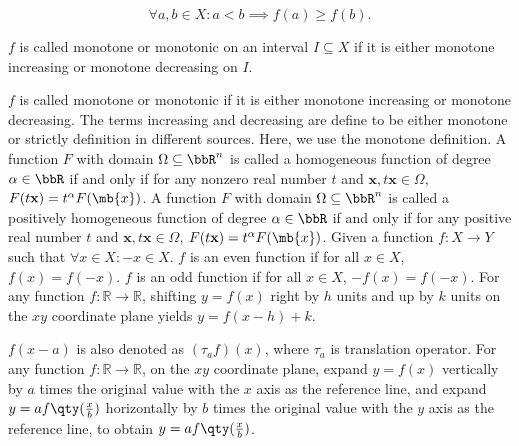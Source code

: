 \documentclass[a4paper,12pt]{article}
\begin{document}
\[\forall a,b\in X\colon a<b\implies f(a)\geq f(b).\]
\item $f$ is called monotone or monotonic on an interval $I\subseteq X$ if it is either monotone increasing or monotone decreasing on $I$.
\item $f$ is called monotone or monotonic if it is either monotone increasing or monotone decreasing.
\eit
The terms increasing and decreasing are define to be either monotone or strictly definition in different sources. Here, we use the monotone definition.
A function $F$ with domain $\Omega\subseteq\bbR^n$ is called a homogeneous function of degree $\alpha\in\bbR$ if and only if for any nonzero real number $t$ and $\mathbf{x},t\mathbf{x}\in\Omega$, $F(t\mathbf{x})=t^{\alpha}F(\mb{x})$.
A function $F$ with domain $\Omega\subseteq\bbR^n$ is called a positively homogeneous function of degree $\alpha\in\bbR$ if and only if for any positive real number $t$ and $\mathbf{x},t\mathbf{x}\in\Omega$, $F(t\mathbf{x})=t^{\alpha}F(\mb{x})$.
Given a function $f\colon X\to Y$ such that $\forall x\in X\colon -x\in X$.
$f$ is an even function if for all $x\in X$, $f(x)=f(-x)$.
$f$ is an odd function if for all $x\in X$, $-f(x)=f(-x)$.
For any function $f\colon\mathbb{R}\to\mathbb{R}$, shifting $y=f(x)$ right by $h$ units and up by $k$ units on the $xy$ coordinate plane yields $y=f(x-h)+k$.

$f(x-a)$ is also denoted as $(\tau_af)(x)$, where $\tau_a$ is translation operator.
For any function $f\colon\mathbb{R}\to\mathbb{R}$, on the $xy$ coordinate plane, expand $y=f(x)$ vertically by $a$ times the original value with the $x$ axis as the reference line, and expand $y=af\qty(\frac{x}{b})$ horizontally by $b$ times the original value with the $y$ axis as the reference line, to obtain $y=af\qty(\frac{x}{b})$.
\end{document}
